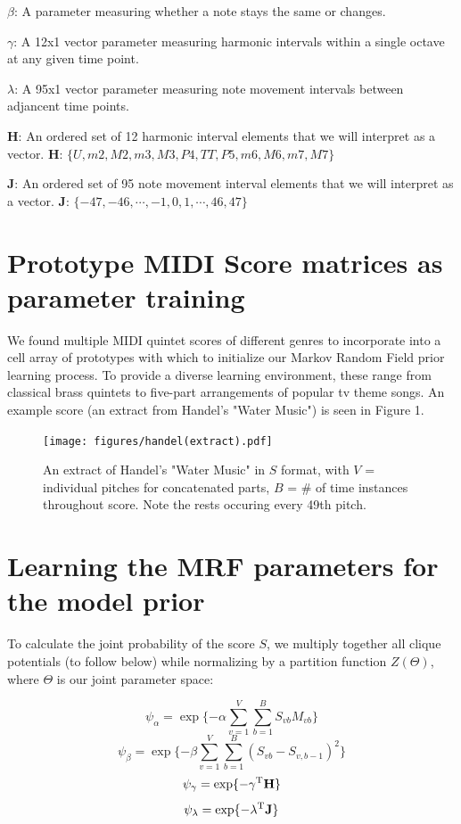 \documentclass{article}
\begin{document}
$\beta$: A parameter measuring whether a note stays the same or changes.

$\gamma$: A 12x1 vector parameter measuring harmonic intervals within a single octave at any given time point.

$\lambda$: A 95x1 vector parameter measuring note movement intervals between adjancent time points.

{\bf H}: An ordered set of 12 harmonic interval elements that we will interpret as a vector.  {\bf H}: $\{U, m2, M2, m3, M3, P4, TT, P5, m6, M6, m7, M7\}$

{\bf J}: An ordered set of 95 note movement interval elements that we will interpret as a vector.  {\bf J}: $\{-47, -46, \cdots, -1, 0, 1, \cdots, 46, 47\}$


\section{Prototype MIDI Score matrices as parameter training}

We found multiple MIDI quintet scores of different genres to incorporate into a cell array of prototypes with which to initialize our Markov Random Field prior learning process.  To provide a diverse learning environment, these range from classical brass quintets to five-part arrangements of popular tv theme songs.  An example score (an extract from Handel's "Water Music") is seen in Figure 1.

\begin{figure}
\centering
\texttt{[image: figures/handel(extract).pdf]}
\caption{An extract of Handel's "Water Music" in $S$ format, with $V$ = individual pitches for concatenated parts, $B$ = \# of time instances throughout score.  Note the rests occuring every 49th pitch.}
\label{fig-1}
\end{figure}

\section{Learning the MRF parameters for the model prior}

To calculate the joint probability of the score $S$, we multiply together all clique potentials (to follow below) while normalizing by a partition function $Z\left(\Theta\right)$, where $\Theta$ is our joint parameter space:

\[\psi_\alpha = \exp\{-\alpha\sum_{v=1}^V\sum_{b=1}^B{S_{vb}M_{vb}}\}\]
\[\psi_\beta = \exp\{-\beta\sum_{v=1}^V\sum_{b=1}^B{(S_{vb}-S_{v,b-1})^2}\}\]
\[\psi_\gamma = \exp\{-\gamma^\mathrm{T}{\bf H}\}\]
\[\psi_{\bf \lambda} = \exp\{-\lambda^\mathrm{T}{\bf J}\}\]
\end{document}
